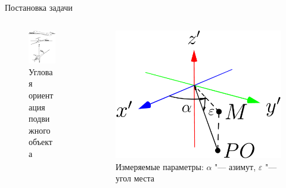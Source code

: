 \documentclass[russian,hyperref={unicode}]{beamer}
\begin{document}
  \begin{frame}{Постановка задачи}
    \begin{columns}[c]
      \begin{column}{.5\textwidth}
        \begin{figure}
          \begin{center}
            \includegraphics[height=.7\textheight]{yaw_pitch_roll}
            \caption{Угловая ориентация подвижного объекта}
          \end{center}
        \end{figure}
      \end{column}
      \begin{column}{.5\textwidth}
        \begin{figure}
          \begin{center}
            \includegraphics[width=1.0\linewidth]{cs}
            \caption{Измеряемые параметры: $\alpha$ "--- азимут, $\varepsilon$ "--- угол места}
          \end{center}
        \end{figure}
      \end{column}
    \end{columns}
  \end{frame}
\end{document}
